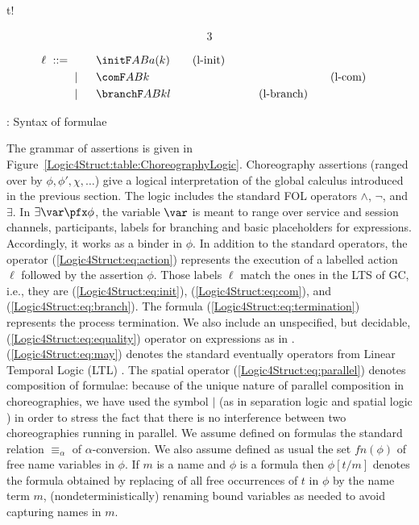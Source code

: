 \begin{myfigure}{t!}
\begin{minipage}{.5\textwidth}
\begin{alignat}{3}
    \end{alignat}
  \end{minipage}
  \hfill
  \begin{minipage}{.5\textwidth}
    \begin{alignat}{3}
      \ell \ ::= \ & \phantom{{}\mid{}}
      &\ & \initF A B {a(k)} \label{Logic4Struct:eq:init} \tag{l-init} \\
      & \mid && \comF ABk && \label{Logic4Struct:eq:com} \tag{l-com}\\
      & \mid && \branchF ABkl & \label{Logic4Struct:eq:branch} \tag{l-branch}
    \end{alignat}
  \end{minipage}
  \caption{\texorpdfstring{\GL}{GL}: Syntax of formulae}
  \label{Logic4Struct:table:ChoreographyLogic}
\end{myfigure}
The grammar of assertions is given in
Figure~\ref{Logic4Struct:table:ChoreographyLogic}.  Choreography
assertions (ranged over by $\phi, \phi', \chi, \dots$) give a logical
interpretation of the global calculus introduced in the previous
section.  The logic includes the standard FOL operators $\land$,
$\neg$, and $\exists$. In $\exists \var \pfx \phi$, the variable
$\var$ is meant to range over service and session channels,
participants, labels for branching and basic placeholders for
expressions.  Accordingly, it works as a binder in $\phi$.  In
addition to the standard operators, the operator
(\ref{Logic4Struct:eq:action}) represents the execution of a labelled
action $\ell$ followed by the assertion $\phi$. Those labels $\ell$
match the ones in the LTS of GC, i.e., they are
(\ref{Logic4Struct:eq:init}), (\ref{Logic4Struct:eq:com}), and
(\ref{Logic4Struct:eq:branch}).  The formula
(\ref{Logic4Struct:eq:termination}) represents the process
termination.  We also include an unspecified, but decidable,
(\ref{Logic4Struct:eq:equality}) operator on expressions as in
\cite{Berger2008Completeness-an}.  (\ref{Logic4Struct:eq:may}) denotes
the standard eventually operators from Linear Temporal Logic (LTL)
\cite{emerson1991temporal}. The spatial operator
(\ref{Logic4Struct:eq:parallel}) denotes composition of formulae:
because of the unique nature of parallel composition in
choreographies, we have used the symbol $\mid$ (as in separation logic
\cite{reynolds2002sll} and spatial logic \cite{caires2001spatial}) in
order to stress the fact that there is no interference between two
choreographies running in
parallel. %
We assume defined on formulas the standard relation $\equiv_\alpha$ of
$\alpha$-conversion.
 We also assume defined as usual the set $fn(\phi)$ of free name
 variables in $\phi$. If $m$ is a name and $\phi$ is a formula then
$\phi[t/m]$ denotes the formula obtained by replacing of all free
occurrences of $t$ in $\phi$ by the name term $m$, (nondeterministically) renaming bound
variables as needed to avoid capturing names in $m$.



